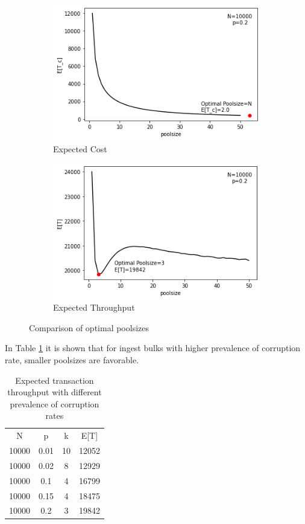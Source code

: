 \begin{figure}[b]%
    \centering
    \begin{subfigure}{6cm}
    \includegraphics[width=\linewidth]{graphics/expected_cost.png}
    \caption{Expected Cost}\label{fig:expected_cost}
    \end{subfigure}
    \qquad
    \begin{subfigure}{6cm}
    \includegraphics[width=\linewidth]{graphics/expected_throughput.png}
    \caption{Expected Throughput}\label{fig:expected_throughput}
    \end{subfigure}
    \caption{Comparison of optimal poolsizes}%
    \label{fig:optimal_pool_size}%
\end{figure}
In Table \ref{tb:expected costs}  it is shown that for ingest bulks with higher prevalence of corruption rate, smaller poolsizes are favorable.
\begin{table}[h]
    \caption{Expected transaction throughput with different prevalence of corruption rates}
    \centering
    \begin{tabular}{ c c c c}
    \label{tb:expected costs}
     N & p & k & E[T] \\ 
     10000 & 0.01 & 10 & 12052 \\ 
     \hline
     10000 & 0.02 & 8 & 12929 \\  
     \hline
     10000 & 0.1 & 4 & 16799 \\  
     \hline
     10000 & 0.15 & 4 & 18475 \\  
     \hline
     10000 & 0.2 & 3 & 19842  
    \end{tabular}
\end{table}
